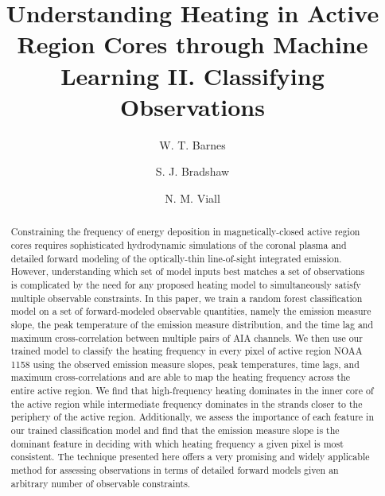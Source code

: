 \documentclass[modern,linenumbers,longauthor]{aastex63}
\newcommand{\AR}{active region}
\begin{document}
\title{Understanding Heating in Active Region Cores through Machine Learning II. Classifying Observations}
\author[0000-0001-9642-6089]{W. T. Barnes}
\author[0000-0002-3300-6041]{S. J. Bradshaw}
\author[0000-0003-1692-1704]{N. M. Viall}

\begin{abstract}
Constraining the frequency of energy deposition in magnetically-closed \AR{} cores requires sophisticated hydrodynamic simulations of the coronal plasma and detailed forward modeling of the optically-thin line-of-sight integrated emission.
However, understanding which set of model inputs best matches a set of observations is complicated by the need for any proposed heating model to simultaneously satisfy multiple observable constraints.
In this paper, we train a random forest classification model on a set of forward-modeled observable quantities, namely the emission measure slope, the peak temperature of the emission measure distribution, and the time lag and maximum cross-correlation between multiple pairs of AIA channels.
We then use our trained model to classify the heating frequency in every pixel of \AR{} NOAA 1158 using the observed emission measure slopes, peak temperatures, time lags, and maximum cross-correlations and are able to map the heating frequency across the entire active region.
We find that high-frequency heating dominates in the inner core of the \AR{} while intermediate frequency dominates in the strands closer to the periphery of the \AR{}.
Additionally, we assess the importance of each feature in our trained classification model and find that the emission measure slope is the dominant feature in deciding with which heating frequency a given pixel is most consistent.
The technique presented here offers a very promising and widely applicable method for assessing observations in terms of detailed forward models given an arbitrary number of observable constraints.
\end{abstract}
\end{document}

